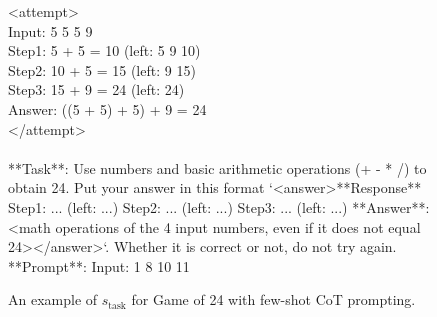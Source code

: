\documentclass{article} %
\newcommand{\0}{\mathbf{0}}
\begin{document}
\begin{figure}
\begin{tcolorbox}[
      colback=gray!5!white, 
      colframe=black!100!black, 
      width=1\textwidth
  ]
<attempt> \\
Input: 5 5 5 9 \\  
Step1: 5 + 5 = 10 (left: 5 9 10) \\  
Step2: 10 + 5 = 15 (left: 9 15) \\  
Step3: 15 + 9 = 24 (left: 24) \\  
Answer: ((5 + 5) + 5) + 9 = 24 \\  
</attempt> \\
\\
    **Task**: Use numbers and basic arithmetic operations (+ - * /) to obtain 24. Put your answer in this format `<answer>**Response** Step1: ... (left: ...) Step2: ... (left: ...) Step3: ... (left: ...) **Answer**: <math operations of the 4 input numbers, even if it does not equal 24></answer>`. Whether it is correct or not, do not try again. \\
    **Prompt**: Input: 1 8 10 11
  \end{tcolorbox}
  \caption{An example of $s_{\text{task}}$ for Game of 24 with few-shot CoT prompting.}
  \label{fig:s_task_game_24}
\end{figure}


\end{document}
